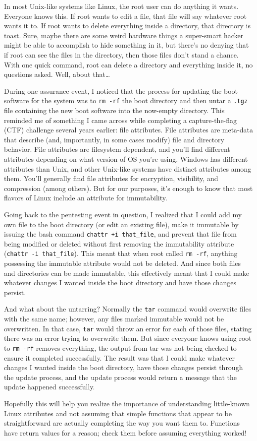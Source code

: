 In most Unix-like systems like Linux, the root user can do anything it wants. Everyone knows this. If root wants to edit a file, that file will say whatever root wants it to. If root wants to delete everything inside a directory, that directory is toast. Sure, maybe there are some weird hardware things a super-smart hacker might be able to accomplish to hide something in it,\autocite[Malicious Hardware]{20240527:hood} but there's no denying that if root can see the files in the directory, then those files don't stand a chance. With one quick command, root can delete a directory and everything inside it, no questions asked. Well, about that\ldots

During one assurance event, I noticed that the process for updating the boot software for the system was to \texttt{rm -rf} the boot directory and then untar a \texttt{.tgz} file containing the new boot software into the now-empty directory. This reminded me of something I came across while completing a capture-the-flag (CTF) challenge several years earlier: file attributes. File attributes are meta-data that describe (and, importantly, in some cases modify) file and directory behavior. File attributes are filesystem dependent, and you'll find different attributes depending on what version of OS you're using. Windows has different attributes than Unix, and other Unix-like systems have distinct attributes among them. You'll generally find file attributes for encryption, visibility, and compression (among others). But for our purposes, it's enough to know that most flavors of Linux include an attribute for immutability.

Going back to the pentesting event in question, I realized that I could add my own file to the boot directory (or edit an existing file), make it immutable by issuing the bash command \texttt{chattr +i that\_file}, and prevent that file from being modified or deleted without first removing the immutability attribute (\texttt{chattr -i that\_file}). This meant that when root called \texttt{rm -rf}, anything possessing the immutable attribute would not be deleted. And since both files and directories can be made immutable, this effectively meant that I could make whatever changes I wanted inside the boot directory and have those changes persist.

And what about the untarring? Normally the \texttt{tar} command would overwrite files with the same name; however, any files marked immutable would not be overwritten. In that case, \texttt{tar} would throw an error for each of those files, stating there was an error trying to overwrite them. But since everyone knows using root to \texttt{rm -rf} removes everything, the output from tar was not being checked to ensure it completed successfully. The result was that I could make whatever changes I wanted inside the boot directory, have those changes persist through the update process, and the update process would return a message that the update happened successfully.

Hopefully this will help you realize the importance of understanding little-known Linux attributes and not assuming that simple functions that appear to be straightforward are actually completing the way you want them to. Functions have return values for a reason; check them before assuming everything worked!
